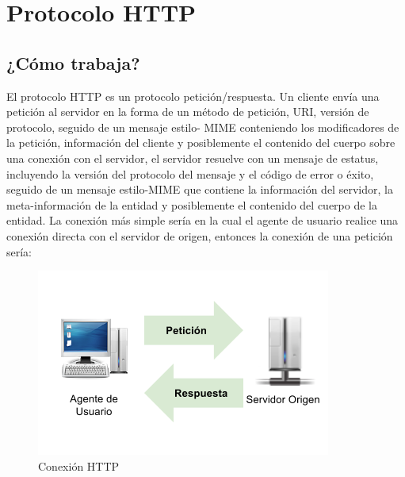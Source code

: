 
\chapter{Protocolo HTTP} %

\label{ch:protocolo_http} %




\section{¿Cómo trabaja?}

El protocolo HTTP es un protocolo petición/respuesta. Un cliente envía una petición al servidor en la forma de un método de petición, URI, versión de protocolo, seguido de un mensaje estilo-
MIME conteniendo los modificadores de la petición, información del cliente y posiblemente el contenido del cuerpo sobre una conexión con el servidor, el servidor resuelve con un mensaje de estatus, incluyendo la versión del protocolo del mensaje y el código de error o éxito, seguido de un mensaje estilo-MIME que contiene la información del servidor, la meta-información de la entidad y posiblemente el contenido del cuerpo de la entidad.
La conexión más simple sería en la cual el agente de usuario realice una conexión directa con el servidor de origen, entonces la conexión de una petición sería:

\begin{figure}[h]
  \centering
    \includegraphics[scale=0.75]{gfx/conexion_http}
  \caption{Conexión HTTP}
  \label{conexionhttp}
\end{figure}


